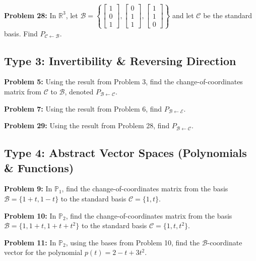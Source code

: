 \documentclass[11pt]{article}
\begin{document}
\vspace{0.5cm}
\textbf{Problem 28:} In $\mathbb{R}^3$, let $\mathcal{B} = \left\{ \begin{bmatrix} 1 \\ 0 \\ 1 \end{bmatrix}, \begin{bmatrix} 0 \\ 1 \\ 1 \end{bmatrix}, \begin{bmatrix} 1 \\ 1 \\ 0 \end{bmatrix} \right\}$ and let $\mathcal{C}$ be the standard basis. Find $P_{\mathcal{C} \leftarrow \mathcal{B}}$.

\subsection*{Type 3: Invertibility \& Reversing Direction}
\textbf{Problem 5:} Using the result from Problem 3, find the change-of-coordinates matrix from $\mathcal{C}$ to $\mathcal{B}$, denoted $P_{\mathcal{B} \leftarrow \mathcal{C}}$.

\vspace{0.5cm}
\textbf{Problem 7:} Using the result from Problem 6, find $P_{\mathcal{B} \leftarrow \mathcal{E}}$.

\vspace{0.5cm}
\textbf{Problem 29:} Using the result from Problem 28, find $P_{\mathcal{B} \leftarrow \mathcal{C}}$.

\subsection*{Type 4: Abstract Vector Spaces (Polynomials \& Functions)}
\textbf{Problem 9:} In $\mathbb{P}_1$, find the change-of-coordinates matrix from the basis $\mathcal{B} = \{1+t, 1-t\}$ to the standard basis $\mathcal{C} = \{1, t\}$.

\vspace{0.5cm}
\textbf{Problem 10:} In $\mathbb{P}_2$, find the change-of-coordinates matrix from the basis $\mathcal{B} = \{1, 1+t, 1+t+t^2\}$ to the standard basis $\mathcal{C} = \{1, t, t^2\}$.

\vspace{0.5cm}
\textbf{Problem 11:} In $\mathbb{P}_2$, using the bases from Problem 10, find the $\mathcal{B}$-coordinate vector for the polynomial $p(t) = 2 - t + 3t^2$.
\end{document}
